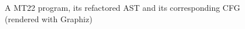 \begin{figure}[ht]
\begin{minipage}[t]{\textwidth}
  \end{minipage}
  \caption{A MT22 program, its refactored AST and its corresponding CFG (rendered with Graphiz)}
\end{figure}
